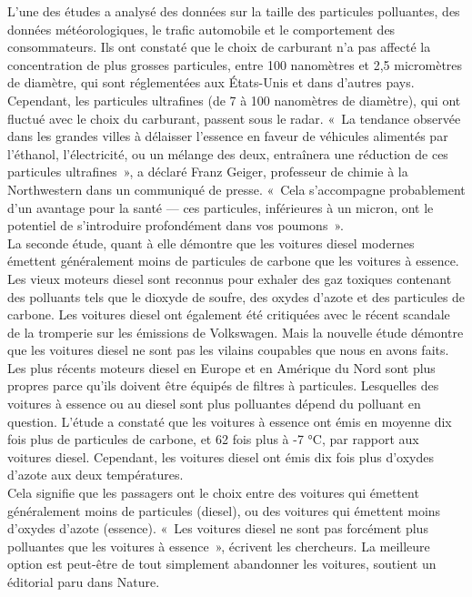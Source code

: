 \documentclass[8pt]{article}
\begin{document}
L’une des études a analysé des données sur la taille des particules polluantes, des données météorologiques, le trafic automobile et le comportement des consommateurs. Ils ont constaté que le choix de carburant n’a pas affecté la concentration de plus grosses particules, entre 100 nanomètres et 2,5 micromètres de diamètre, qui sont réglementées aux États-Unis et dans d’autres pays.
Cependant, les particules ultrafines (de 7 à 100 nanomètres de diamètre), qui ont fluctué avec le choix du carburant, passent sous le radar. «~La tendance observée dans les grandes villes à délaisser l’essence en faveur de véhicules alimentés par l’éthanol, l’électricité, ou un mélange des deux, entraînera une réduction de ces particules ultrafines~», a déclaré Franz Geiger, professeur de chimie à la Northwestern dans un communiqué de presse. «~Cela s’accompagne probablement d’un avantage pour la santé — ces particules, inférieures à un micron, ont le potentiel de s’introduire profondément dans vos poumons~».\\

La seconde étude, quant à elle démontre que les voitures diesel modernes émettent généralement moins de particules de carbone que les voitures à essence.
Les vieux moteurs diesel sont reconnus pour exhaler des gaz toxiques contenant des polluants tels que le dioxyde de soufre, des oxydes d’azote et des particules de carbone. Les voitures diesel ont également été critiquées avec le récent scandale de la tromperie sur les émissions de Volkswagen.
Mais la nouvelle étude démontre que les voitures diesel ne sont pas les vilains coupables que nous en avons faits. Les plus récents moteurs diesel en Europe et en Amérique du Nord sont plus propres parce qu’ils doivent être équipés de filtres à particules. Lesquelles des voitures à essence ou au diesel sont plus polluantes dépend du polluant en question.
L'étude a constaté que les voitures à essence ont émis en moyenne dix fois plus de particules de carbone, et 62 fois plus à -7 °C, par rapport aux voitures diesel. Cependant, les voitures diesel ont émis dix fois plus d’oxydes d’azote aux deux températures.\\

Cela signifie que les passagers ont le choix entre des voitures qui émettent généralement moins de particules (diesel), ou des voitures qui émettent moins d’oxydes d’azote (essence). «~Les voitures diesel ne sont pas forcément plus polluantes que les voitures à essence~», écrivent les chercheurs.
La meilleure option est peut-être de tout simplement abandonner les voitures, soutient un éditorial paru dans Nature.
\end{document}
